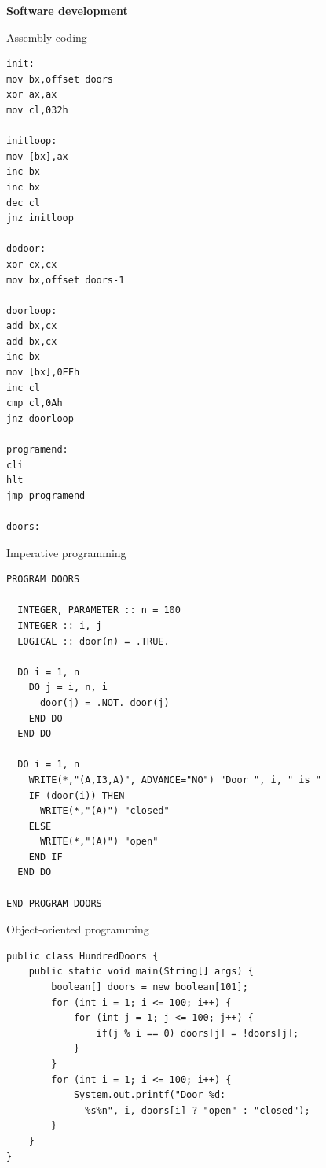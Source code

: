 \documentclass[dvips,slidetop,mathserif,brown]{beamer}
\begin{document}
\begin{frame}{}
  \begin{center}
    \begin{Huge}
      \textbf{Software development}
    \end{Huge}
  \end{center}
\end{frame}

\begin{frame}[containsverbatim]{Assembly coding}
  \begin{tiny}
    \begin{verbatim}
init:
mov bx,offset doors
xor ax,ax
mov cl,032h

initloop:
mov [bx],ax
inc bx
inc bx
dec cl
jnz initloop

dodoor:
xor cx,cx
mov bx,offset doors-1

doorloop:
add bx,cx
add bx,cx
inc bx
mov [bx],0FFh
inc cl
cmp cl,0Ah
jnz doorloop

programend:
cli
hlt
jmp programend

doors:
    \end{verbatim}
  \end{tiny}
\end{frame}

\begin{frame}[containsverbatim]{Imperative programming}
  \begin{footnotesize}
    \begin{verbatim}
PROGRAM DOORS

  INTEGER, PARAMETER :: n = 100
  INTEGER :: i, j
  LOGICAL :: door(n) = .TRUE.

  DO i = 1, n
    DO j = i, n, i
      door(j) = .NOT. door(j)
    END DO
  END DO

  DO i = 1, n
    WRITE(*,"(A,I3,A)", ADVANCE="NO") "Door ", i, " is "
    IF (door(i)) THEN
      WRITE(*,"(A)") "closed"
    ELSE
      WRITE(*,"(A)") "open"
    END IF
  END DO

END PROGRAM DOORS
    \end{verbatim}
  \end{footnotesize}
\end{frame}

\begin{frame}[containsverbatim]{Object-oriented programming}
  \begin{footnotesize}
    \begin{verbatim}
public class HundredDoors {
    public static void main(String[] args) {
        boolean[] doors = new boolean[101];
        for (int i = 1; i <= 100; i++) {
            for (int j = 1; j <= 100; j++) {
                if(j % i == 0) doors[j] = !doors[j];
            }
        }
        for (int i = 1; i <= 100; i++) {
            System.out.printf("Door %d:
              %s%n", i, doors[i] ? "open" : "closed");
        }
    }
}
    \end{verbatim}
  \end{footnotesize}
\end{frame}
\end{document}
